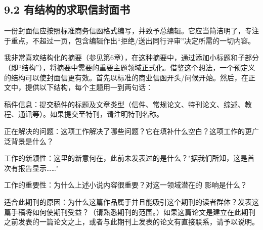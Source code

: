 \subsection*{9.2 有结构的求职信封面书}
一份封面信应按照标准商务信函格式编写，并致予总编辑。它应当简洁明了，专注于重点，不超过一页，包含编辑作出“拒绝/送出同行评审”决定所需的一切内容。

我非常喜欢结构化的摘要（参见第6章），在这种摘要中，通过添加小标题和子部分（即“结构”），将摘要中需要的重要主题领域正式化。借鉴这个想法，一个预定义的结构可以使封面信更有效。首先以标准的商业信函开头/问候开始。然后，在正文中，提供以下结构，每个主题用一到两句话：

稿件信息：提交稿件的标题及文章类型（信件、常规论文、特刊论文、综述、教程、通讯等）。如果提交至特刊，请注明特刊名称。

正在解决的问题：这项工作解决了哪些问题？它在填补什么空白？这项工作的更广泛背景是什么？

工作的新颖性：这里的新意何在，此前未发表过的是什么？"据我们所知，这是首次有报告显示……"

工作的重要性：为什么上述小说内容很重要？对这一领域潜在的 影响是什么？

适合此期刊的原因：为什么这篇作品属于并且能吸引这个期刊的读者群体？发表这篇手稿将如何使期刊受益？（请熟悉期刊的范围。）如果这篇论文是建立在此期刊之前发表的一篇论文之上，或者与此期刊上发表的论文有直接联系，请予以说明。

